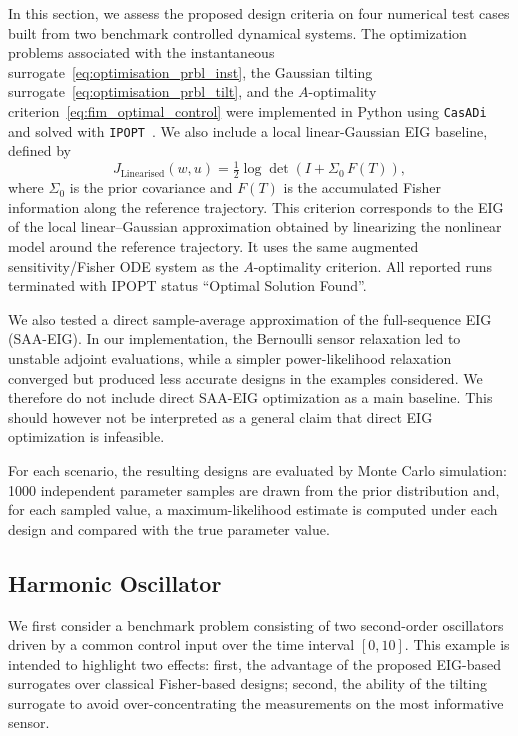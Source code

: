 \documentclass[a4paper,11pt]{article}
\begin{document}
In this section, we assess the proposed design criteria on four numerical test cases built from two benchmark controlled dynamical systems.
The optimization problems associated with the instantaneous
surrogate~\eqref{eq:optimisation_prbl_inst}, the Gaussian tilting
surrogate~\eqref{eq:optimisation_prbl_tilt}, and the \(A\)-optimality
criterion~\eqref{eq:fim_optimal_control} were implemented in Python using
\texttt{CasADi}~\cite{Andersson2019} and solved with
\texttt{IPOPT}~\cite{Waechter2006}. We also include a local linear-Gaussian EIG baseline, defined by
\[
  J_{\mathrm{Linearised
}}(w,u)
  =
  \tfrac{1}{2} \log\det\!\left(I+\Sigma_0\, F(T)\right),
\]
where \(\Sigma_0\) is the prior covariance and \(F(T)\) is the accumulated
Fisher information along the reference trajectory. This criterion corresponds
to the EIG of the local linear--Gaussian approximation obtained by linearizing
the nonlinear model around the reference trajectory. It uses the same
augmented sensitivity/Fisher ODE system as the \(A\)-optimality criterion.
All reported runs terminated with IPOPT status ``Optimal Solution Found''. 


We also tested a direct sample-average approximation of the full-sequence EIG (SAA-EIG).
In our implementation, the Bernoulli sensor relaxation led to unstable adjoint
evaluations, while a simpler power-likelihood relaxation converged but produced
less accurate designs in the examples considered. We therefore do not include
direct SAA-EIG optimization as a main baseline. This should however not be interpreted
as a general claim that direct EIG optimization is infeasible.


For each scenario, the resulting designs are evaluated by Monte Carlo simulation: 1000 independent parameter samples are drawn from the prior distribution and, for each sampled value, a maximum-likelihood estimate is computed under each design and compared with the true parameter value. 


\subsection{Harmonic Oscillator}

We first consider a benchmark problem consisting of two second-order oscillators driven by a common control input over the time interval \([0,10]\). This example is intended to highlight two effects: first, the advantage of the proposed EIG-based surrogates over classical Fisher-based designs; second, the ability of the tilting surrogate to avoid over-concentrating the measurements on the most informative sensor.
\end{document}

